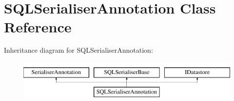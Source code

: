\hypertarget{class_s_q_l_serialiser_annotation}{}\section{S\+Q\+L\+Serialiser\+Annotation Class Reference}
\label{class_s_q_l_serialiser_annotation}
Inheritance diagram for S\+Q\+L\+Serialiser\+Annotation\+:\begin{figure}[H]
\begin{center}
\leavevmode
\includegraphics[height=2.000000cm]{class_s_q_l_serialiser_annotation}
\end{center}
\end{figure}
